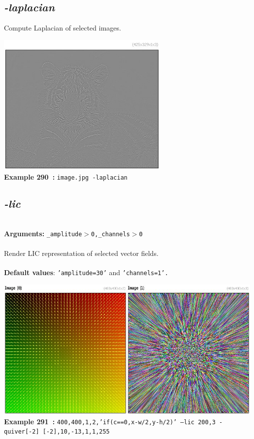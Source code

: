 \documentclass[a4paper,11pt,twoside]{book}
\begin{document}
\subsection{\emph{-laplacian} }\vspace*{-0.5em}
Compute Laplacian of selected images.
\begin{center}\includegraphics[keepaspectratio=true,height=7cm,width=\textwidth]{img/gmic_def290.jpg}\\
{\footnotesize \textbf{Example 290~:} \texttt{image.jpg -laplacian}}
\end{center}

\subsection{\emph{-lic} }\vspace*{-0.5em}
~\\\textbf{Arguments: } 
{\small \texttt{\_amplitude$>$0,\_channels$>$0}}\\~\\
Render LIC representation of selected vector fields.
~\\~\\\textbf{Default values}: {\small \texttt{'amplitude=30'} and \texttt{'channels=1'.}}
\begin{center}\includegraphics[keepaspectratio=true,height=7cm,width=\textwidth]{img/gmic_def291.jpg}\\
{\footnotesize \textbf{Example 291~:} \texttt{400,400,1,2,'if(c==0,x-w/2,y-h/2)' --lic 200,3 -quiver[-2] [-2],10,-13,1,1,255}}
\end{center}
\end{document}
